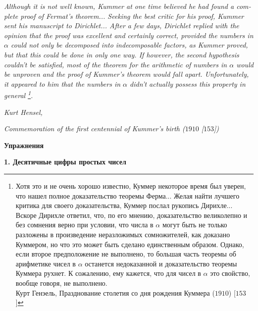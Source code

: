 \documentclass{mai_book}
\begin{document}
\begin{english}

\hangindent=3cm 
\textit{Although it is not well known, Kummer at one time believed he had found a complete proof of Fermat's theorem... Seeking the
best critic for his proof, Kummer sent his manu\-script to Dirichlet...
After a few days, Dirichlet replied with the opinion that the proof
was excellent and certainly correct, provided the numbers in $\alpha$ could
not only be decomposed into indecomposable factors, as Kummer
proved, but that this could be done in only one way. If however,
the second hypothesis couldn't be satisfied, most of the theorem for
the arithmetic of numbers in $\alpha$ would be unproven and the proof
of Kummer's theorem would fall apart. Unfortunately, it appeared to him that the numbers in $\alpha$ didn't actually possess this property in
general \footnote{Хотя это и не очень хорошо известно, Куммер некоторое время был уверен, что нашел полное доказательство теоремы Ферма... Желая найти лучшего критика для своего доказательства, Куммер послал рукопись Дирихле... Вскоре Дирихле ответил, что, по его мнению, доказательство великолепно и без сомнения верно при условии, что числа в $\alpha$ могут быть не только разложены в произведение неразложимых сомножителей, как доказано Куммером, но что это может быть сделано единственным образом. Однако, если второе предположение не выполнено, то большая часть теоремы об арифметике чисел в $\alpha$ останется недоказанной и доказательство теоремы Куммера рухнет. К сожалению, ему кажется, что для чисел в $\alpha$ это свойство,
вообще говоря, не выполнено. \\ \indent Курт Генэель, Празднование столетия со дня рождения Куммера ($1910$) [$153$]}.}

\begin{flushright}
\textit{Kurt Hensel,}

\textit{Commemoration of the first centennial of Kummer's birth ($1910$ [$153$])}
\end{flushright}

\end{english}

\newpage

\begin{center}
\Large\textbf{Упражнения}
\end{center}
\cleartop

\vspace{20pt}

\noindent \textbf{1. Десятичные цифры простых чисел}
\end{document}
